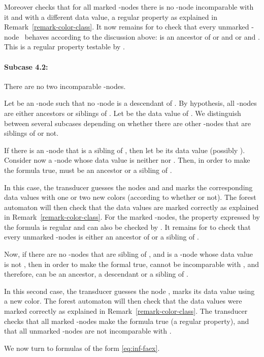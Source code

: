 \documentclass{CSML}
\begin{document}
Moreover  checks that for all marked -nodes there is no
-node incomparable with it and with a different data value, a regular
property as explained in Remark~\ref{remark-color-class}.
It now remains for  to check that every unmarked -node~ behaves
according to the discussion above: 
 is an ancestor of  or  and  or  and .
This is a regular property testable by .

\paragraph{\bf Subcase 4.2:} There are no two incomparable -nodes. 

Let  be an -node such that no -node is a descendant of . 
By hypothesis, all -nodes are either ancestors or siblings of . 
Let  be the data value of .
We distinguish between several subcases depending on whether 
there are other -nodes that are siblings of  or not.

If there is an -node  that is a sibling of , then let 
be its data value (possibly ).  Consider
now a -node  whose data value is neither  nor .  
Then, in order to make the formula true,  must be an ancestor or a sibling of .

In this case, the transducer  guesses the nodes  and  and marks the
corresponding data values with one or two new colors (according to whether 
or not).  The forest automaton  will then check that the data values are marked
correctly as explained in Remark~\ref{remark-color-class}.
For the marked -nodes, the property expressed by the formula
is regular and can also be checked by .
It remains for  to check that every unmarked -nodes is 
either an ancestor of  or a sibling of .

Now, if there are no -nodes that are sibling of ,
and  is a -node whose data value is not , 
then in order to make the formal true,  cannot be incomparable with , 
and therefore,  can be an ancestor, a descendant or a sibling of .

In this second case, the transducer  guesses the node , 
marks its data value using a new color. 
The forest automaton  will then check that the data values were marked
correctly as explained in Remark~\ref{remark-color-class}.
The transducer  checks that all marked -nodes make the formula true
(a regular property),
and that all unmarked -nodes are not incomparable with .

\medskip

We now turn to formulas of the form \eqref{eq:inf-faex}.
\end{document}
